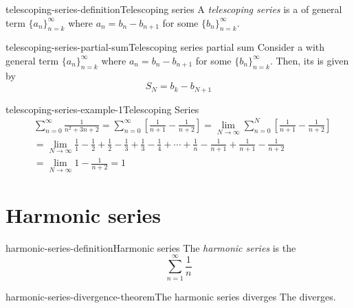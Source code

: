 \documentclass[preview]{standalone}
\begin{document}
\begin{snippetdefinition}{telescoping-series-definition}{Telescoping series}
    A \textit{telescoping series} is a \series of general term \(\{a_n\}_{n=k}^\infty\)
    where \(a_n = b_n - b_{n+1}\) for some \sequence \(\{b_n\}_{n=k}^\infty\).
\end{snippetdefinition}

\begin{snippetproposition}{telescoping-series-partial-sum}{Telescoping series partial sum}
    Consider a \telescopicseries with general term \(\{a_n\}_{n=k}^\infty\)
    where \(a_n = b_n - b_{n+1}\) for some \sequence \(\{b_n\}_{n=k}^\infty\).
    Then, its \partialsum is given by
    \[ S_N = b_k - b_{N+1} \]
\end{snippetproposition}

\begin{snippetexample}{telescoping-series-example-1}{Telescoping Series}
    \begin{align*}
        &\sum_{n=0}^\infty \frac{1}{n^2 + 3n + 2}
        = \sum_{n=0}^\infty \left[ \frac{1}{n+1} - \frac{1}{n+2} \right]
        = \lim_{N \to \infty} \sum_{n=0}^N \left[ \frac{1}{n+1} - \frac{1}{n+2} \right] \\
        &= \lim_{N \to \infty} \frac{1}{1} - \frac{1}{2} + \frac{1}{2} - \frac{1}{3}
        + \frac{1}{3} - \frac{1}{4} + \cdots + \frac{1}{n} - \frac{1}{n+1} +
        \frac{1}{n+1} - \frac{1}{n+2} \\
        &= \lim_{N \to \infty} 1 - \frac{1}{n+2} = 1
    \end{align*}
\end{snippetexample}

\section{Harmonic series}

\begin{snippetdefinition}{harmonic-series-definition}{Harmonic series}
    The \textit{harmonic series} is the \series
    \[
        \sum_{n=1}^\infty \frac{1}{n}
    \]
\end{snippetdefinition}

\begin{snippettheorem}{harmonic-series-divergence-theorem}{The harmonic series diverges}
    The \harmonicseries diverges.
\end{snippettheorem}
\end{document}
